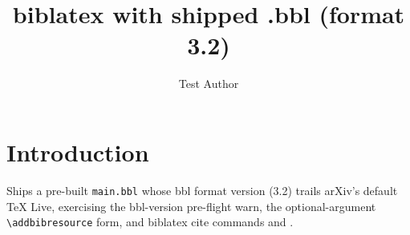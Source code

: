 \documentclass{article}
\title{biblatex with shipped .bbl (format 3.2)}
\author{Test Author}
\begin{document}
\maketitle

\section{Introduction}
Ships a pre-built \texttt{main.bbl} whose bbl format version (3.2) trails
arXiv's default TeX Live, exercising the bbl-version pre-flight warn, the
optional-argument \texttt{\textbackslash addbibresource} form, and biblatex
cite commands \autocite{einstein1905} and \textcite{doe2024}.

\printbibliography
\end{document}
